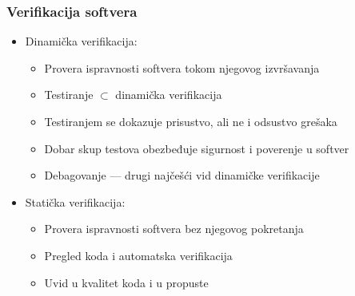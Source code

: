 \documentclass[11pt]{beamer}
\theoremstyle{definition}
\begin{document}
{%
\begin{frame}
\frametitle{Verifikacija softvera}
\begin{itemize}
\item Dinamička verifikacija:
	\begin{itemize}
		\item Provera ispravnosti softvera tokom njegovog izvršavanja
		\item Testiranje $\subset$ dinamička verifikacija
		\item Testiranjem se dokazuje prisustvo, ali ne i odsustvo grešaka
		\item Dobar skup testova obezbeđuje sigurnost i poverenje u softver
		\item Debagovanje --- drugi najčešći vid dinamičke verifikacije
	\end{itemize}
\item Statička verifikacija:
	\begin{itemize}
		\item Provera ispravnosti softvera bez njegovog pokretanja
		\item Pregled koda i automatska verifikacija
		\item Uvid u kvalitet koda i u propuste
	\end{itemize}
\end{itemize}
\end{frame}

}
\end{document}
